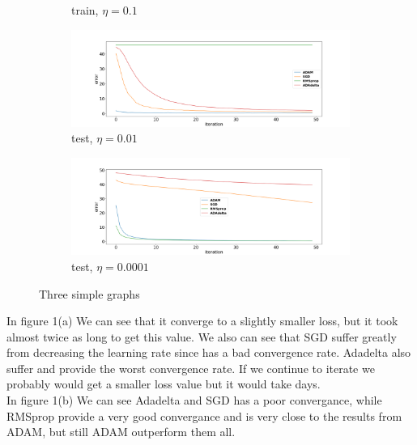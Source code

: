 \documentclass[10pt,a4paper]{article}
\begin{document}
\begin{figure}
\begin{subfigure}[b]{0.3\textwidth}
         \caption{train, $\eta = 0.1$}
         \label{fig:$\eta = 0.1$}
     \hfill
     \end{subfigure}
     \begin{subfigure}[b]{0.3\textwidth}
         \centering
         \includegraphics[width=1.5\textwidth]{test_lr=0.01.png}
         \caption{test, $\eta = 0.01$}
         \label{fig:$\eta = 0.01$}
     \end{subfigure}
     \hfill
     \begin{subfigure}[b]{0.3\textwidth}
         \centering
         \includegraphics[width=1.5\textwidth]{test_lr=0.0001.png}
         \caption{test, $\eta = 0.0001$}
         \label{fig:$\eta = 0.0001$}
     \end{subfigure}
        \caption{Three simple graphs}
        \label{fig: loss as function of iterations, on train set and test set with different learning rate}
\end{figure}


In figure 1(a) We can see that it converge to a slightly smaller loss, but it took almost twice as long to get this value. We also can see that SGD suffer greatly from decreasing the learning rate since has a bad convergence rate. Adadelta also suffer and provide the worst convergence rate. If we continue to iterate we probably would get a smaller loss value but it would take days. \\

In figure 1(b) We can see Adadelta and SGD has a poor convergance, while RMSprop provide a very good convergance and is very close to the results from ADAM, but still ADAM outperform them all.\\
\end{document}

